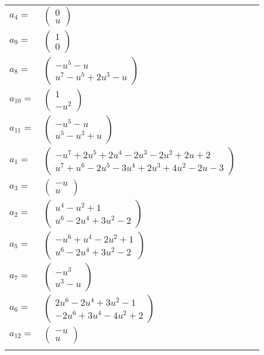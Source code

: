 \documentclass[1p]{elsarticle_modified}
\theoremstyle{definition}
\begin{document}
\begin{tabular}{m{7pt} m{180pt} m{7pt} m{180pt} }
\flushright $a_{4}=$&$\begin{pmatrix}0\\u\end{pmatrix}$ \\
\flushright $a_{9}=$&$\begin{pmatrix}1\\0\end{pmatrix}$ \\
\flushright $a_{8}=$&$\begin{pmatrix}- u^5- u\\u^7- u^5+2 u^3- u\end{pmatrix}$ \\
\flushright $a_{10}=$&$\begin{pmatrix}1\\- u^2\end{pmatrix}$ \\
\flushright $a_{11}=$&$\begin{pmatrix}- u^5- u\\u^5- u^3+u\end{pmatrix}$ \\
\flushright $a_{1}=$&$\begin{pmatrix}- u^7+2 u^5+2 u^4-2 u^3-2 u^2+2 u+2\\u^7+u^6-2 u^5-3 u^4+2 u^3+4 u^2-2 u-3\end{pmatrix}$ \\
\flushright $a_{3}=$&$\begin{pmatrix}- u\\u\end{pmatrix}$ \\
\flushright $a_{2}=$&$\begin{pmatrix}u^4- u^2+1\\u^6-2 u^4+3 u^2-2\end{pmatrix}$ \\
\flushright $a_{5}=$&$\begin{pmatrix}- u^6+u^4-2 u^2+1\\u^6-2 u^4+3 u^2-2\end{pmatrix}$ \\
\flushright $a_{7}=$&$\begin{pmatrix}- u^3\\u^3- u\end{pmatrix}$ \\
\flushright $a_{6}=$&$\begin{pmatrix}2 u^6-2 u^4+3 u^2-1\\-2 u^6+3 u^4-4 u^2+2\end{pmatrix}$ \\
\flushright $a_{12}=$&$\begin{pmatrix}- u\\u\end{pmatrix}$\\&\end{tabular}
\end{document}
